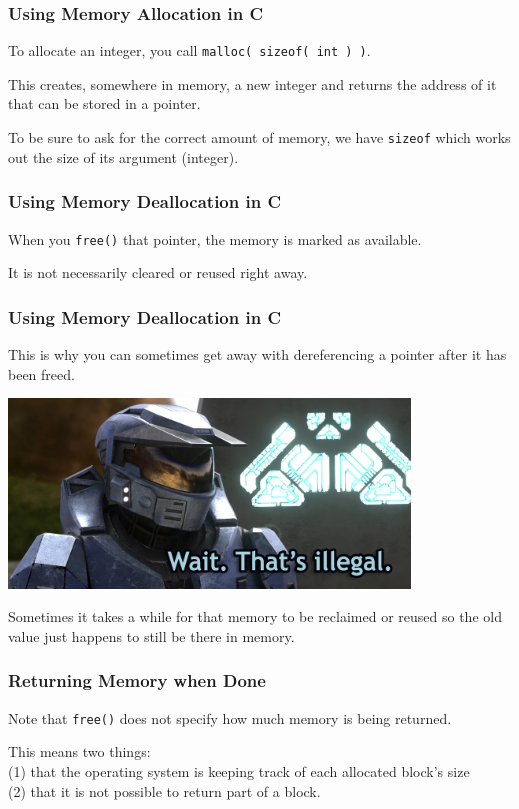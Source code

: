 \begin{frame}
\frametitle{Using Memory Allocation in C}

To allocate an integer, you call \texttt{malloc( sizeof( int ) )}. 

This creates, somewhere in memory, a new integer and returns the address of it that can be stored in a pointer.

To be sure to ask for the correct amount of memory, we have \texttt{sizeof} which works out the size of its argument (integer).


\end{frame}

\begin{frame}
\frametitle{Using Memory Deallocation in C}

When you \texttt{free()} that pointer, the memory is marked as available.

It is not necessarily cleared or reused right away.

\end{frame}

\begin{frame}
\frametitle{Using Memory Deallocation in C}

This is why you can sometimes get away with dereferencing a pointer after it has been freed. 

\begin{center}
	\includegraphics[width=0.8\textwidth]{images/illegal.jpg}
\end{center}

Sometimes it takes a while for that memory to be reclaimed or reused so the old value just happens to still be there in memory. 

\end{frame}

\begin{frame}
\frametitle{Returning Memory when Done}

Note that \texttt{free()} does not specify how much memory is being returned. 

This means two things:\\ 
\quad (1) that the operating system is keeping track of each allocated block's size\\
\quad (2) that it is not possible to return part of a block.



\end{frame}

